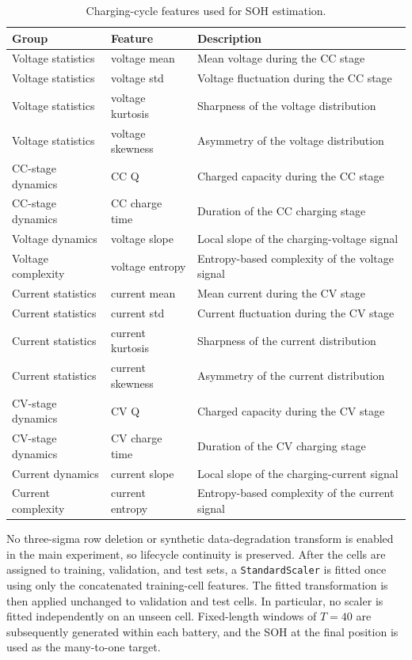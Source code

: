 \documentclass[pdflatex,sn-mathphys-num]{sn-jnl}
\begin{document}
\begin{table}[t]
\caption{Charging-cycle features used for SOH estimation.}
\label{tab:features}
\centering
\begin{tabular}{lll}
\toprule
Group & Feature & Description \\
\midrule
Voltage statistics & voltage mean & Mean voltage during the CC stage \\
Voltage statistics & voltage std & Voltage fluctuation during the CC stage \\
Voltage statistics & voltage kurtosis & Sharpness of the voltage distribution \\
Voltage statistics & voltage skewness & Asymmetry of the voltage distribution \\
CC-stage dynamics & CC Q & Charged capacity during the CC stage \\
CC-stage dynamics & CC charge time & Duration of the CC charging stage \\
Voltage dynamics & voltage slope & Local slope of the charging-voltage signal \\
Voltage complexity & voltage entropy & Entropy-based complexity of the voltage signal \\
Current statistics & current mean & Mean current during the CV stage \\
Current statistics & current std & Current fluctuation during the CV stage \\
Current statistics & current kurtosis & Sharpness of the current distribution \\
Current statistics & current skewness & Asymmetry of the current distribution \\
CV-stage dynamics & CV Q & Charged capacity during the CV stage \\
CV-stage dynamics & CV charge time & Duration of the CV charging stage \\
Current dynamics & current slope & Local slope of the charging-current signal \\
Current complexity & current entropy & Entropy-based complexity of the current signal \\
\bottomrule
\end{tabular}
\end{table}

No three-sigma row deletion or synthetic data-degradation transform is enabled in the main experiment, so lifecycle continuity is preserved. After the cells are assigned to training, validation, and test sets, a \texttt{StandardScaler} is fitted once using only the concatenated training-cell features. The fitted transformation is then applied unchanged to validation and test cells. In particular, no scaler is fitted independently on an unseen cell. Fixed-length windows of $T=40$ are subsequently generated within each battery, and the SOH at the final position is used as the many-to-one target.
\end{document}
